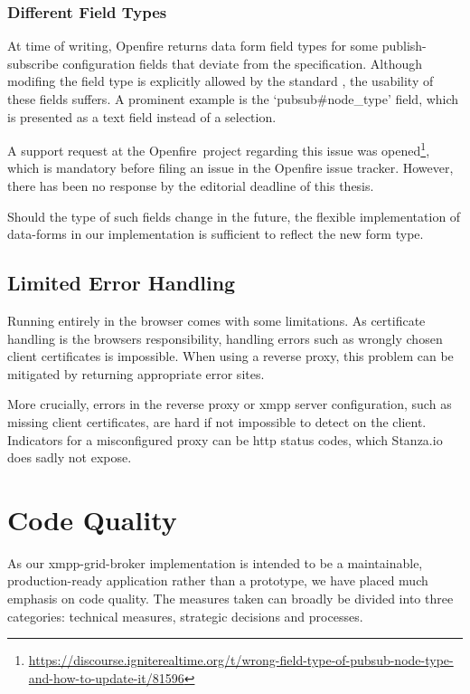 \subsubsection{Different Field Types}

At time of writing, Openfire returns data form field types for some \gls{publish-subscribe} configuration fields that deviate from the specification.
Although modifing the field type is explicitly allowed by the standard \cite{xep-0060}, the usability of these fields suffers.
A prominent example is the `pubsub\#node\_type' field, which is presented as a text field instead of a selection.

A support request at the Openfire~project regarding this issue was opened\footnote{\url{https://discourse.igniterealtime.org/t/wrong-field-type-of-pubsub-node-type-and-how-to-update-it/81596}},
which is mandatory before filing an issue in the Openfire issue tracker.
However, there has been no response by the editorial deadline of this thesis.

Should the type of such fields change in the future, the flexible implementation of \gls{data-forms} in our implementation is sufficient to reflect the new form type.

\subsection{Limited Error Handling}

Running entirely in the browser comes with some limitations. As certificate handling is the browsers responsibility, handling errors such as wrongly chosen client certificates is impossible. When using a reverse proxy, this problem can be mitigated by returning appropriate error sites.

More crucially, errors in the reverse proxy or \gls{xmpp} server configuration, such as missing client certificates, are hard if not impossible to detect on the client. Indicators for a misconfigured proxy can be \gls{http} status codes, which Stanza.io does sadly not expose.

\section{Code Quality}
As our \gls{xmpp-grid-broker} implementation is intended to be a maintainable, production-ready application rather than a prototype, we have placed much emphasis on code quality.
The measures taken can broadly be divided into three categories: technical measures, strategic decisions and processes.

